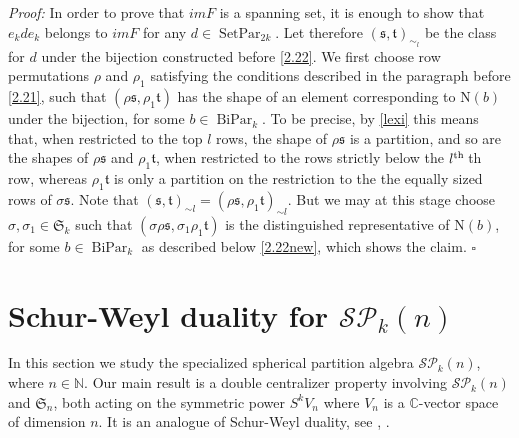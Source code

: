 \documentclass[10pt,hidelinks]{article}
\newcommand{\norm}{\text{N}}
\newcommand{\SpheAlg}{{\mathcal{SP} }_{k}}
\newcommand{\N}{ { \mathbb N}}
\newcommand{\CC}{ \mathbb C }
\newcommand{\s}{\mathfrak{s}}
\newcommand{\T}{  \mathfrak{t}}
\newcommand{\Si}{\mathfrak{S}}
\newcommand{\BiPar}{ \operatorname{BiPar}}
\newcommand{\SetPar}{ \operatorname{SetPar}}
\newcommand{\ppm}[1]{\textcolor{black}{#1}}
\newenvironment{dem}{\noindent \textit{Proof:} }{\quad \hfill $\square$}
\numberwithin{equation}{section}
\begin{document}
\begin{dem}
\medskip
In order to prove that $ im  F $ is a spanning set, it is enough to show that  
$ e_k d e_k $ belongs to $ im  F $ for any $ d \in \SetPar_{2k} $. 
Let therefore $ ( \s, \T )_{\sim_l } $ be the class for $ d $ under
the bijection constructed before \eqref{2.22}. We first  
choose row permutations $ \rho $ and $ \rho_1 $
satisfying the conditions described in the paragraph before \eqref{2.21}, such that
$ (\rho \s, \rho_1  \T )  $ has the shape of an element corresponding to $ \norm(b) $ 
under the bijection, for some $ b \in \BiPar_k $. To be precise, 
by \eqref{lexi} this means that,
when restricted to the top $ l $
rows, the shape of $ \rho \s $ is a partition, and so are the shapes of $ \rho \s $ and $ \rho_1 \T $,
when restricted to the 
rows strictly below the $ l^{\color{black} \rm th} \,$th row, whereas $ \rho_1 \T $ is only a partition on 
the restriction to the the equally sized rows of $ \sigma \s $. Note that 
$ ( \s, \T )_{\sim l} = ( \rho \s, \rho_1 \T )_{\sim l} $. But we may at this stage choose $ \sigma, \sigma_1 \in \Si_k $
such that $ ( \sigma  \rho \s, \sigma_1 \rho_1 \T ) $ is the distinguished representative of $ \norm(b) $, for
some $ b \in \BiPar_k $ as described below \eqref{2.22new}, which shows the claim.
\end{dem}  




\section{Schur-Weyl duality for $\SpheAlg(n)$ }\label{Schur-Weyl duality}
In this section we study the specialized spherical partition algebra 
$\SpheAlg(n)$, where $ n \in \N$. Our main result
is a double centralizer property
involving $\SpheAlg(n)$ and $ \Si_n $, 
both acting on the symmetric power $ S^{k} V_n $ where $ V_n$ is a $\CC $-vector space of dimension 
$ n $. It is an analogue of Schur-Weyl duality, see \cite{Schur}, \cite{Weyl}. 
\end{document}
